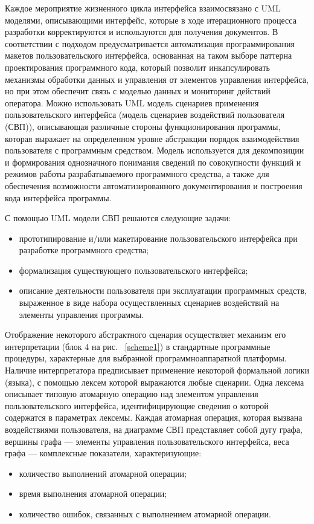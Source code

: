	Каждое мероприятие жизненного цикла интерфейса взаимосвязано с UML моделями, описывающими интерфейс, которые в ходе итерационного процесса разработки корректируются и используются для получения документов.
	В соответствии с подходом предусматривается автоматизация программирования макетов пользовательского интерфейса, основанная на таком выборе паттерна проектирования программного кода, который позволит инкапсулировать механизмы обработки данных и управления от элементов управления интерфейса, но при этом обеспечит связь с моделью данных и мониторинг действий оператора.
	Можно использовать UML модель сценариев применения пользовательского интерфейса (модель сценариев воздействий пользователя (СВП)), описывающая различные стороны функционирования программы, которая выражает на определенном уровне абстракции порядок взаимодействия пользователя с программным средством. Модель используется для декомпозиции и формирования однозначного понимания сведений по совокупности функций и режимов работы разрабатываемого программного средства, а также для обеспечения возможности автоматизированного документирования и построения кода интерфейса программы.

	С помощью UML модели СВП решаются следующие задачи: 
\begin{itemize}
	\item прототипирование и/или макетирование пользовательского интерфейса при разработке программного средства;
	\item формализация существующего пользовательского интерфейса;
	\item описание деятельности пользователя при эксплуатации программных средств, выраженное в виде набора осуществленных сценариев воздействий на элементы управления программы.
\end{itemize}

	Отображение некоторого абстрактного сценария осуществляет механизм его интерпретации (блок 4 на рис. ~\ref{scheme1}) в стандартные программные процедуры, характерные для выбранной программноаппаратной платформы. Наличие интерпретатора предписывает применение некоторой формальной логики (языка), с помощью лексем которой выражаются любые сценарии. Одна лексема описывает типовую атомарную операцию над элементом управления пользовательского интерфейса, идентифицирующие сведения о которой содержатся в параметрах лексемы.
	Каждая атомарная операция, которая вызвана воздействиями пользователя, на диаграмме СВП представляет собой дугу графа, вершины графа — элементы управления пользовательского интерфейса, веса графа — комплексные показатели, характеризующие:
\begin{itemize}
	\item количество выполнений атомарной операции; 
	\item время выполнения атомарной операции;
	\item количество ошибок, связанных с выполнением атомарной операции.
\end{itemize}
\noteattributes{}

